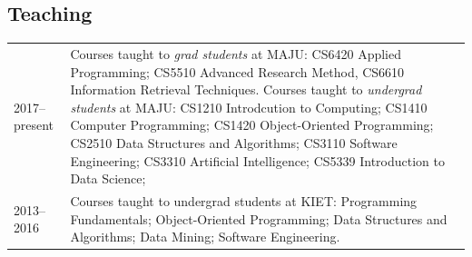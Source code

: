\documentclass[a4paper, 10pt]{article}
\begin{document}
\subsection*{\textcolor{NavyBlue}{Teaching}}
{
\tabcolsep=4pt
\begin{tabular}{lp{16cm}}
2017--present & Courses taught to \emph{ grad students} at MAJU: CS6420 Applied Programming; CS5510 Advanced Research Method, CS6610 Information Retrieval Techniques.
\newline Courses taught to \emph{ undergrad students} at MAJU: CS1210 Introdcution to Computing; CS1410 Computer Programming; CS1420 Object-Oriented Programming; CS2510 Data Structures and Algorithms; CS3110 Software Engineering; CS3310 Artificial Intelligence; CS5339 Introduction to Data Science;\\
2013--2016 & Courses taught to undergrad students at KIET: Programming Fundamentals; Object-Oriented Programming; Data Structures and Algorithms; Data Mining; Software Engineering.
\end{tabular}
}
\end{document}
